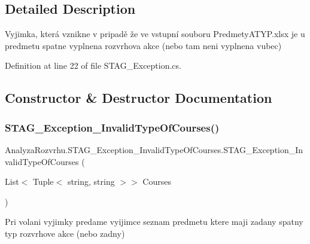 \subsection{Detailed Description}
Vyjimka, která vznikne v pripadě že ve vstupní souboru Predmety\+A\+T\+Y\+P.\+xlsx je u predmetu spatne vyplnena rozvrhova akce (nebo tam neni vyplnena vubec) 



Definition at line 22 of file S\+T\+A\+G\+\_\+\+Exception.\+cs.



\subsection{Constructor \& Destructor Documentation}
\mbox{\label{class_analyza_rozvrhu_1_1_s_t_a_g___exception___invalid_type_of_courses_ae00012c0be919cf8d2555b285807b8de}} 
\subsubsection{\texorpdfstring{S\+T\+A\+G\+\_\+\+Exception\+\_\+\+Invalid\+Type\+Of\+Courses()}{STAG\_Exception\_InvalidTypeOfCourses()}\hspace{0.1cm}{\footnotesize\ttfamily [1/2]}}
{\footnotesize\ttfamily Analyza\+Rozvrhu.\+S\+T\+A\+G\+\_\+\+Exception\+\_\+\+Invalid\+Type\+Of\+Courses.\+S\+T\+A\+G\+\_\+\+Exception\+\_\+\+Invalid\+Type\+Of\+Courses (\begin{DoxyParamCaption}\item[{List$<$ Tuple$<$ string, string $>$$>$}]{Courses }\end{DoxyParamCaption})}



Pri volani vyjimky predame vyijimce seznam predmetu ktere maji zadany spatny typ rozvrhove akce (nebo zadny) 


